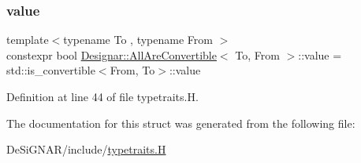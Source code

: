 \subsubsection{\texorpdfstring{value}{value}}
{\footnotesize\ttfamily template$<$typename To , typename From $>$ \\
constexpr bool \hyperlink{struct_designar_1_1_all_are_convertible}{Designar\+::\+All\+Are\+Convertible}$<$ To, From $>$\+::value = std\+::is\+\_\+convertible$<$From, To$>$\+::value\hspace{0.3cm}{\ttfamily [static]}}



Definition at line 44 of file typetraits.\+H.



The documentation for this struct was generated from the following file\+:\begin{DoxyCompactItemize}
\item 
De\+Si\+G\+N\+A\+R/include/\hyperlink{typetraits_8_h}{typetraits.\+H}\end{DoxyCompactItemize}
